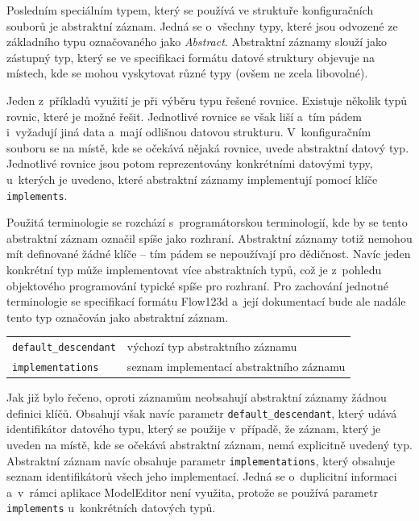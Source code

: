 \documentclass[FM,bw,DP]{tulthesis}
\begin{document}
Posledním speciálním typem, který se používá ve struktuře konfiguračních souborů je abstraktní záznam. Jedná se o~všechny typy, které jsou odvozené ze základního typu označovaného jako \textit{Abstract}. Abstraktní záznamy slouží jako zástupný typ, který se ve specifikaci formátu datové struktury objevuje na místech, kde se mohou vyskytovat různé typy (ovšem ne zcela libovolné).

Jeden z~příkladů využití je při výběru typu řešené rovnice. Existuje několik typů rovnic, které je možné řešit. Jednotlivé rovnice se však liší a~tím pádem i~vyžadují jiná data a~mají odlišnou datovou strukturu. V~konfiguračním souboru se na místě, kde se očekává nějaká rovnice, uvede abstraktní datový typ. Jednotlivé rovnice jsou potom reprezentovány konkrétními datovými typy, u~kterých je uvedeno, které abstraktní záznamy implementují pomocí klíče \texttt{implements}.

Použitá terminologie se rozchází s~programátorskou terminologií, kde by se tento abstraktní záznam označil spíše jako rozhraní. Abstraktní záznamy totiž nemohou mít definované žádné klíče -- tím pádem se nepoužívají pro dědičnost. Navíc jeden konkrétní typ může implementovat více abstraktních typů, což je z~pohledu objektového programování typické spíše pro rozhraní. Pro zachování jednotné terminologie se specifikací formátu Flow123d a~její dokumentací bude ale nadále tento typ označován jako abstraktní záznam.

\vspace{0.5cm}
\begin{tabular}{m{5cm}@{}l}
\texttt{default\_descendant}\dotfill & výchozí typ abstraktního záznamu \\
\texttt{implementations}\dotfill & seznam implementací abstraktního záznamu \\
\end{tabular}
\vspace{0.5cm}

Jak již bylo řečeno, oproti záznamům neobsahují abstraktní záznamy žádnou definici klíčů. Obsahují však navíc parametr \texttt{default\_descendant}, který udává identifikátor datového typu, který se použije v~případě, že záznam, který je uveden na místě, kde se očekává abstraktní záznam, nemá explicitně uvedený typ. Abstraktní záznam navíc obsahuje parametr \texttt{implementations}, který obsahuje seznam identifikátorů všech jeho implementací. Jedná se o~duplicitní informaci a~v~rámci aplikace ModelEditor není využita, protože se používá parametr \texttt{implements} u~konkrétních datových typů.
\end{document}
